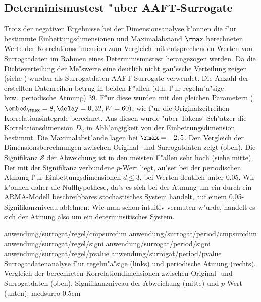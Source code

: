 \subsection{Determinismustest "uber AAFT-Surrogate}

Trotz der negativen Ergebnisse bei der Dimensionsanalyse k"onnen die f"ur bestimmte
Einbettungsdimensionen und Maximalabstand $\rmax$ berechneten Werte der
Korrelationsdimension zum Vergleich mit entsprechenden Werten von Surrogatdaten im Rahmen
eines Determinismustest herangezogen werden. Da die Dichteverteilung der Me"swerte eine
deutlich nicht gau"ssche Verteilung zeigen (siehe ) wurden als Surrogatdaten
AAFT-Surrogate verwendet. Die Anzahl der erstellten Datenreihen betrug in beiden F"allen
(d.h. f"ur regelm"a"sige bzw.\ periodische Atmung) 39. F"ur diese wurden mit den gleichen
Parametern ($\embed_\tmax=8, \delay=0,32, W=60)$, wie f"ur die Originalzeitreihen
Korrelationsintegrale berechnet. Aus diesen wurde "uber Takens' Sch"atzer die
Korrelationsdimension $D_2$ in Abh"angigkeit von der Einbettungsdimension bestimmt. Die
Maximalabst"ande lagen bei $\rmax=-2,5$. Den Vergleich der Dimensionsberechnungen zwischen
Original- und Surrogatdaten zeigt  (oben).  Die Signifikanz $\mathcal S$
der Abweichung ist in den meisten F"allen sehr hoch (siehe   mitte). Der mit
der Signifikanz verbundene $p$-Wert liegt, au"ser bei der periodischen Atmung f"ur
Einbettungsdimensionen $d\leq3$, bei Werten deutlich unter 0,05. Wir k"onnen daher die
Nullhypothese, da"s es sich bei der Atmung um ein durch ein ARMA-Modell beschreibbares
stochastisches System handelt, auf einem 0,05-Signifikanzniveau ablehnen. Wie man schon
intuitiv vermuten w"urde, handelt es sich der Atmung also um ein determinsitisches System.

\epsfigsix
{anwendung/surrogat/regel/cmpsurcdim}
{anwendung/surrogat/period/cmpsurcdim}
{anwendung/surrogat/regel/signi}
{anwendung/surrogat/period/signi}
{anwendung/surrogat/regel/pvalue}
{anwendung/surrogat/period/pvalue}
{
Surrogatdatenanalyse f"ur regelm"a"sige (links) und periodische Atmung (rechts). 
Vergleich der berechneten Korrelationdimensionen zwischen Original- und Surrogatdaten
(oben), Signifikanzniveau der Abweichung (mitte) und $p$-Wert (unten).
}
{medsurro}{-0.5cm}





